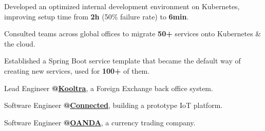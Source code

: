 \documentclass[letterpaper]{deedy-resume} %
\begin{document}
\begin{minipage}[t]{0.63\textwidth}
\sectionspace %
\vspace{-0.3em}


\begin{tightitemize}
\item Developed an optimized internal development environment on Kubernetes, improving setup time from \textbf{2h} (50\% failure rate) to \textbf{6min}.
\item Consulted teams across global offices to migrate \textbf{50+} services onto Kubernetes \& the cloud.
\item Established a Spring Boot service template that became the default way of creating new services, used for \textbf{100+} of them.
\end{tightitemize}

\sectionspace %
\vspace{-0.3em}


\begin{tightitemize}
\item Lead Engineer \textbf{@\href{https://kooltra.com/}{Kooltra}}, a Foreign Exchange back office system.
\item Software Engineer \textbf{@\href{https://connected.io/}{Connected}}, building a prototype IoT platform.
\item Software Engineer \textbf{@\href{https://www.oanda.com/us-en/}{OANDA}}, a currency trading company.
\end{tightitemize}

\end{minipage} %




\end{document}
